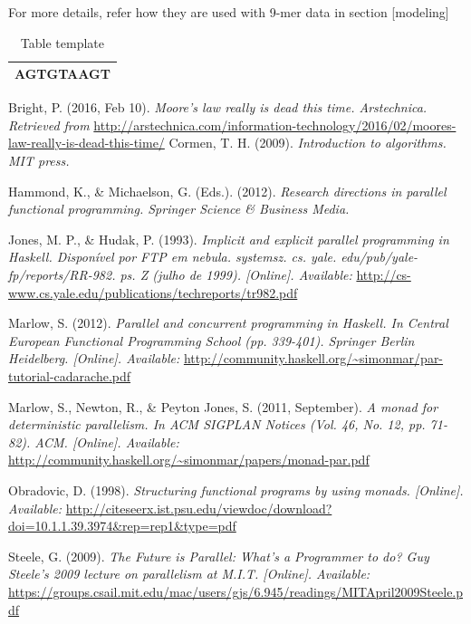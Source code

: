 \documentclass[12pt,a4paper]{article}
\begin{document}
For more details, refer how they are used with 9-mer data in section [modeling]

	\begin{table}[H]
		
		\begin{tabular}{ | c |}
			\hline
			AGT\textbf{GT}AAGT \\
			\hline
		\end{tabular}
		\centering
		\caption{Table template}
	\end{table}

	\begin{thebibliography}{9}
		
		Bright, P. (2016, Feb 10). 
		\textit{Moore’s law really is dead this time. Arstechnica. Retrieved from }	    			
		\url{http://arstechnica.com/information-technology/2016/02/moores-law-really-is-dead-this-time/}
		 Cormen, T. H. (2009). 
		 \textit{Introduction to algorithms. MIT press.}
		 
        Hammond, K., \& Michaelson, G. (Eds.). (2012).
		\textit{Research directions in parallel functional programming. Springer Science \& Business Media.}

		Jones, M. P., \& Hudak, P. (1993). 
		\textit{Implicit and explicit parallel programming in Haskell. Disponível por FTP em nebula. systemsz. cs. yale. edu/pub/yale-fp/reports/RR-982. ps. Z (julho de 1999). [Online]. Available:}
		\url {http://cs-www.cs.yale.edu/publications/techreports/tr982.pdf}
		
		Marlow, S. (2012). 
		\textit{Parallel and concurrent programming in Haskell. In Central European Functional Programming School (pp. 339-401). Springer Berlin Heidelberg.
[Online]. Available: }			\url{http://community.haskell.org/~simonmar/par-tutorial-cadarache.pdf}
		
		Marlow, S., Newton, R., \& Peyton Jones, S. (2011, September). 
		\textit{A monad for deterministic parallelism. In ACM SIGPLAN Notices (Vol. 46, No. 12, pp. 71-82). ACM. [Online]. Available: }	\url{http://community.haskell.org/~simonmar/papers/monad-par.pdf}
		
		Obradovic, D. (1998). 
		\textit{Structuring functional programs by using monads. [Online]. Available: }	\url{http://citeseerx.ist.psu.edu/viewdoc/download?doi=10.1.1.39.3974&rep=rep1&type=pdf}
		
		Steele, G. (2009). 
		\textit{The Future is Parallel: What's a Programmer to do? Guy Steele's 2009 lecture on parallelism at M.I.T. [Online]. Available: }		\url{https://groups.csail.mit.edu/mac/users/gjs/6.945/readings/MITApril2009Steele.pdf}
		
		\end{thebibliography}
	
\end{document}
